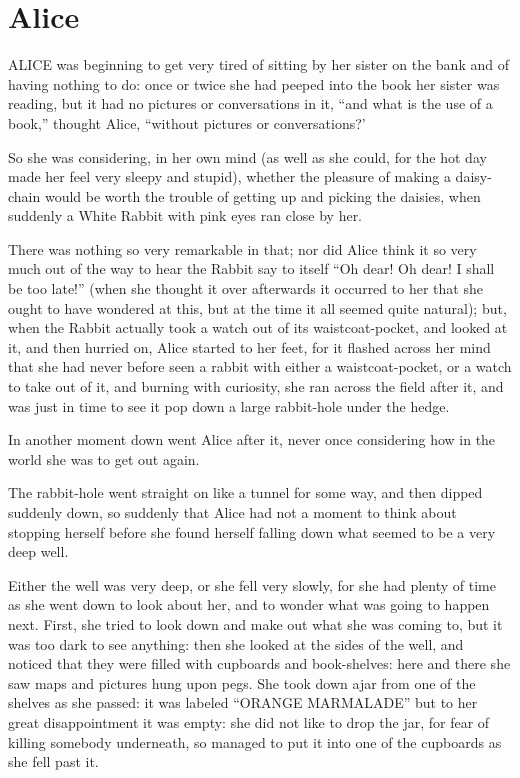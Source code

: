 \documentclass{l3proj}
\begin{document}
\section{Alice}
\label{sec:alice}

ALICE \cite{alice} was beginning to get very tired of sitting by her sister
on the bank and of having nothing to do: once or twice she had peeped into
the book her sister was reading, but it had no pictures or conversations in
it, ``and what is the use of a book,'' thought Alice, ``without pictures or
conversations?'

So she was considering, in her own mind (as well as she could, for the hot
day made her feel very sleepy and stupid), whether the pleasure of making a
daisy-chain would be worth the trouble of getting up and picking the
daisies, when suddenly a White Rabbit with pink eyes ran close by her.

There was nothing so very remarkable in that; nor did Alice think it so
very much out of the way to hear the Rabbit say to itself ``Oh dear! Oh
dear! I shall be too late!'' (when she thought it over afterwards it
occurred to her that she ought to have wondered at this, but at the time it
all seemed quite natural); but, when the Rabbit actually took a watch out
of its waistcoat-pocket, and looked at it, and then hurried on, Alice
started to her feet, for it flashed across her mind that she had never
before seen a rabbit with either a waistcoat-pocket, or a watch to take out
of it, and burning with curiosity, she ran across the field after it, and
was just in time to see it pop down a large rabbit-hole under the hedge.

In another moment down went Alice after it, never once considering how in
the world she was to get out again.

The rabbit-hole went straight on like a tunnel for some way, and then
dipped suddenly down, so suddenly that Alice had not a moment to think
about stopping herself before she found herself falling down what seemed to
be a very deep well.

Either the well was very deep, or she fell very slowly, for she had plenty
of time as she went down to look about her, and to wonder what was going to
happen next. First, she tried to look down and make out what she was coming
to, but it was too dark to see anything: then she looked at the sides of
the well, and noticed that they were filled with cupboards and
book-shelves: here and there she saw maps and pictures hung upon pegs. She
took down ajar from one of the shelves as she passed: it was labeled
``ORANGE MARMALADE'' but to her great disappointment it was empty: she did
not like to drop the jar, for fear of killing somebody underneath, so
managed to put it into one of the cupboards as she fell past it.
\end{document}
